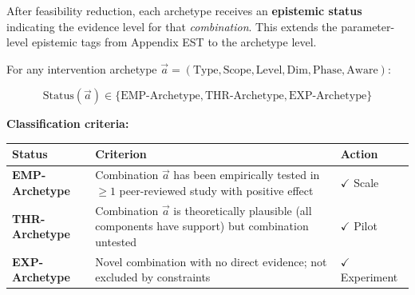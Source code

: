 After feasibility reduction, each archetype receives an \textbf{epistemic status} indicating the evidence level for that \textit{combination}. This extends the parameter-level epistemic tags from Appendix EST to the archetype level.

\begin{tcolorbox}[colback=green!5!white, colframe=green!75!black,
    title=\textbf{Definition HHH-D5: Archetype Epistemic Status}]

For any intervention archetype $\vec{a} = (\text{Type}, \text{Scope}, \text{Level}, \text{Dim}, \text{Phase}, \text{Aware})$:

\begin{equation}
\text{Status}(\vec{a}) \in \{\text{EMP-Archetype}, \text{THR-Archetype}, \text{EXP-Archetype}\}
\end{equation}

\textbf{Classification criteria:}

\begin{center}
\renewcommand{\arraystretch}{1.3}
\begin{tabular}{@{}lp{7cm}l@{}}
\toprule
\textbf{Status} & \textbf{Criterion} & \textbf{Action} \\
\midrule
\cellcolor{green!20}\textbf{EMP-Archetype} &
Combination $\vec{a}$ has been empirically tested in $\geq 1$ peer-reviewed study with positive effect &
$\checkmark$ Scale \\
\cellcolor{blue!20}\textbf{THR-Archetype} &
Combination $\vec{a}$ is theoretically plausible (all components have support) but combination untested &
$\checkmark$ Pilot \\
\cellcolor{orange!20}\textbf{EXP-Archetype} &
Novel combination with no direct evidence; not excluded by constraints &
$\checkmark$ Experiment \\
\bottomrule
\end{tabular}
\end{center}

\end{tcolorbox}

